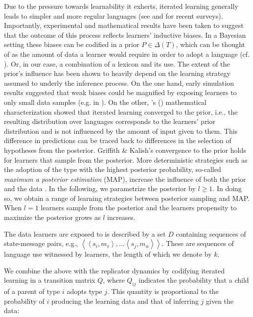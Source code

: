 \documentclass[a4paper]{article}
\newcommand{\citeposs}[2][]{\citeauthor{#2}'s (\citeyear[#1]{#2})}
\newcommand{\tuple}[1]{\ensuremath{\left\langle #1 \right\rangle}}
\begin{document}
Due to the pressure towards learnability it exherts, iterated learning generally leads to simpler and more regular languages (see \citealt{kirby+etal:2014} and \citealt{tamariz+kirby:2016} for recent surveys). Importantly, experimental and mathematical results have been taken to suggest that the outcome of this process reflects learners' inductive biases. In a Bayesian setting these biases can be codified in a prior $P \in \Delta(T)$, which can be thought of as the amount of data a learner would require in order to adopt a language (cf. \citealt[450]{griffiths+kalish:2007}). Or, in our case, a combination of a lexicon and its use. The extent of the prior's influence has been shown to heavily depend on the learning strategy assumed to underly the inference process. On the one hand, early simulation results suggested that weak biases could be magnified by exposing learners to only small data samples (e.g. in \citealt{brighton:2002}). On the other, \citeposs{griffiths+kalish:2007} mathematical characterization showed that iterated learning converged to the prior, i.e., the resulting distribution over languages corresponds to the learners' prior distribution and is not influenced by the amount of input given to them. This difference in predictions can be traced back to differences in the selection of hypotheses from the posterior. Griffith \& Kalish's convergence to the prior holds for learners that sample from the posterior. More deterministic strategies such as the adoption of the type with the highest posterior probability, so-called {\it maximum a posterior estimation} (MAP), increase the influence of both the prior and the data \citep{griffiths+kalish:2007,kirby+etal:2007}. In the following, we parametrize the posterior by $l \geq 1$. In doing so, we obtain a range of learning strategies between posterior sampling and MAP. When $l = 1$ learners sample from the posterior and the learners propensity to maximize the posterior grows as $l$ increases.


The data learners are exposed to is described by a set $D$ containing sequences of state-message pairs, e.g., $\tuple{\tuple{s_i,m_v},...\tuple{s_j,m_w}}$. These are sequences of language use witnessed by learners, the length of which we denote by $k$. %

We combine the above with the replicator dynamics by codifying iterated learning in a transition matrix $Q$, where $Q_{ij}$ indicates the probability that a child of a parent of type $i$ adopts type $j$. This quantity is proportional to the probability of $i$ producing the learning data and that of inferring $j$ given the data: 
\end{document}
